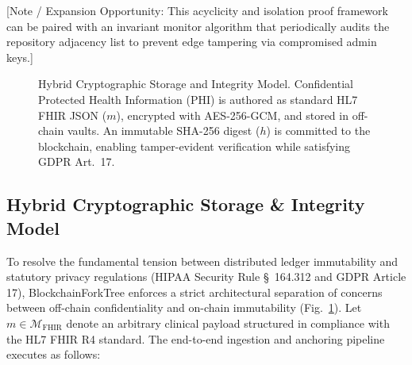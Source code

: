 [Note / Expansion Opportunity: This acyclicity and isolation proof framework can be paired with an invariant monitor algorithm that periodically audits the repository adjacency list to prevent edge tampering via compromised admin keys.]

\begin{figure}[t]
\centering

\caption{Hybrid Cryptographic Storage and Integrity Model. Confidential Protected Health Information (PHI) is authored as standard HL7 FHIR JSON ($m$), encrypted with AES-256-GCM, and stored in off-chain vaults. An immutable SHA-256 digest ($h$) is committed to the blockchain, enabling tamper-evident verification while satisfying GDPR Art.~17.}
\label{fig:crypto}
\end{figure}

\subsection{Hybrid Cryptographic Storage \& Integrity Model}
To resolve the fundamental tension between distributed ledger immutability and statutory privacy regulations (HIPAA Security Rule \S~164.312 and GDPR Article 17), BlockchainForkTree enforces a strict architectural separation of concerns between off-chain confidentiality and on-chain immutability (Fig.~\ref{fig:crypto}). Let $m \in \mathcal{M}_{\text{FHIR}}$ denote an arbitrary clinical payload structured in compliance with the HL7 FHIR R4 standard. The end-to-end ingestion and anchoring pipeline executes as follows:

